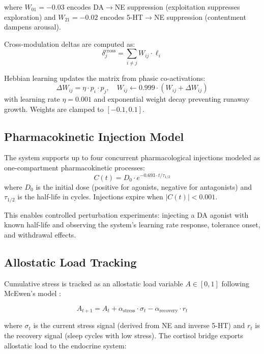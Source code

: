 \documentclass[11pt,a4paper]{article}
\begin{document}
\noindent where $W_{01} = -0.03$ encodes DA$\to$NE suppression (exploitation suppresses exploration) and $W_{21} = -0.02$ encodes 5-HT$\to$NE suppression (contentment dampens arousal).

Cross-modulation deltas are computed as:
\begin{equation}
\delta_j^{\text{cross}} = \sum_{i \neq j} W_{ij} \cdot \ell_i
\end{equation}

Hebbian learning updates the matrix from phasic co-activations:
\begin{equation}
\Delta W_{ij} = \eta \cdot p_i \cdot p_j, \quad W_{ij} \leftarrow 0.999 \cdot (W_{ij} + \Delta W_{ij})
\end{equation}
with learning rate $\eta = 0.001$ and exponential weight decay preventing runaway growth. Weights are clamped to $[-0.1, 0.1]$.

\subsection{Pharmacokinetic Injection Model}

The system supports up to four concurrent pharmacological injections modeled as one-compartment pharmacokinetic processes:
\begin{equation}
C(t) = D_0 \cdot e^{-0.693 \cdot t / \tau_{1/2}}
\end{equation}
where $D_0$ is the initial dose (positive for agonists, negative for antagonists) and $\tau_{1/2}$ is the half-life in cycles. Injections expire when $|C(t)| < 0.001$.

This enables controlled perturbation experiments: injecting a DA agonist with known half-life and observing the system's learning rate response, tolerance onset, and withdrawal effects.

\subsection{Allostatic Load Tracking}

Cumulative stress is tracked as an allostatic load variable $A \in [0, 1]$ following McEwen's model \citep{mcewen1998}:

\begin{equation}
A_{t+1} = A_t + \alpha_{\text{stress}} \cdot \sigma_t - \alpha_{\text{recovery}} \cdot r_t
\end{equation}

\noindent where $\sigma_t$ is the current stress signal (derived from NE and inverse 5-HT) and $r_t$ is the recovery signal (sleep cycles with low stress). The cortisol bridge exports allostatic load to the endocrine system:
\end{document}
